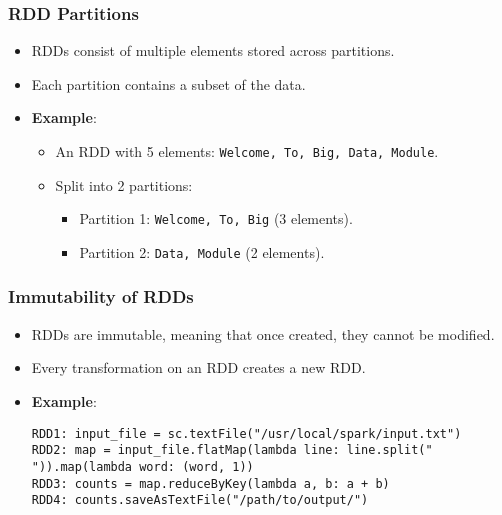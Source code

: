 \documentclass[12pt]{article}
\begin{document}
\subsubsection*{RDD Partitions}
\begin{itemize}
    \item RDDs consist of multiple elements stored across partitions.
    \item Each partition contains a subset of the data.
    \item \textbf{Example}: 
        \begin{itemize}
            \item An RDD with 5 elements: \texttt{Welcome, To, Big, Data, Module}.
            \item Split into 2 partitions:
                \begin{itemize}
                    \item Partition 1: \texttt{Welcome, To, Big} (3 elements).
                    \item Partition 2: \texttt{Data, Module} (2 elements).
                \end{itemize}
        \end{itemize}
\end{itemize}

\subsubsection*{Immutability of RDDs}
\begin{itemize}
    \item RDDs are immutable, meaning that once created, they cannot be modified.
    \item Every transformation on an RDD creates a new RDD.
    \item \textbf{Example}:
    \begin{verbatim}
RDD1: input_file = sc.textFile("/usr/local/spark/input.txt")
RDD2: map = input_file.flatMap(lambda line: line.split(" ")).map(lambda word: (word, 1))
RDD3: counts = map.reduceByKey(lambda a, b: a + b)
RDD4: counts.saveAsTextFile("/path/to/output/")
    \end{verbatim}
\end{itemize}
\end{document}
